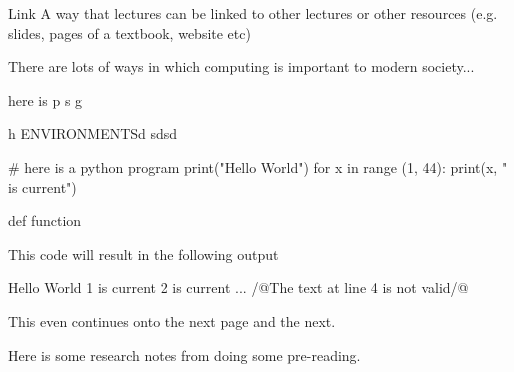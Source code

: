 \documentclass[a4paper, 11pt]{report}
\begin{document}
    

    \begin{link}{Link}
        A way that lectures can be linked to other lectures or other resources (e.g. slides, pages of a textbook, website etc)
    \end{link}
    There are lots of ways in which computing is important to modern society...
\begin{pseudo}
here is p
s
g

h
ENVIRONMENTSd
sdsd
\end{pseudo}

\begin{python}
# here is a python program
print("Hello World")
for x in range (1, 44):
    print(x, " is current")

def function
\end{python}
This code will result in the following output
\begin{pseudo*}
Hello World
1 is current
2 is current
...
/@The text at line 4 is not valid/@
\end{pseudo*}

    \newpage
    This even continues onto the next page
    \newpage
    and the next.




    Here is some research notes from doing some pre-reading.

\end{document}
